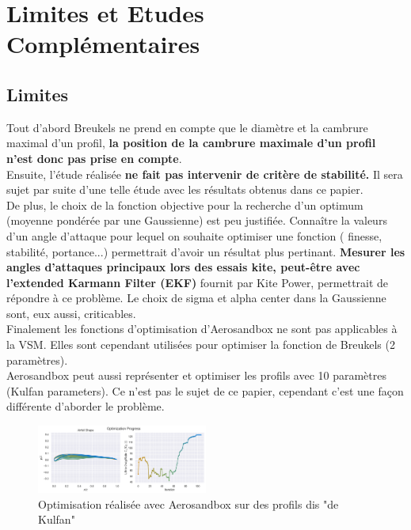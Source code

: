 \IEEEpeerreviewmaketitle
\section{ Limites et Etudes Complémentaires}
\label{sec:Ch4}

\subsection{Limites}
\label{sec:Ch4.1}

Tout d'abord Breukels ne prend en compte que le diamètre et la cambrure maximal d'un profil, \textbf{la position de la cambrure maximale d'un profil n'est donc pas prise en compte}. \\

Ensuite, l'étude réalisée \textbf{ne fait pas intervenir de critère de stabilité.} Il sera sujet par suite d'une telle étude avec les résultats obtenus dans ce papier.\\

De plus, le choix de la fonction objective pour la recherche d'un optimum (moyenne pondérée par une Gaussienne) est peu justifiée. Connaître la valeurs d'un angle d'attaque pour lequel on souhaite optimiser une fonction ( finesse, stabilité, portance...) permettrait d'avoir un résultat plus pertinant. \textbf{Mesurer les angles d'attaques principaux lors des essais kite, peut-être avec l'extended Karmann Filter (EKF)} fournit par Kite Power, permettrait de répondre à ce problème. Le choix de sigma et alpha center dans la Gaussienne sont, eux aussi, criticables.\\

Finalement les fonctions d'optimisation d'Aerosandbox ne sont pas applicables à la VSM. Elles sont cependant utilisées pour optimiser la fonction de Breukels (2 paramètres). \\
Aerosandbox peut aussi représenter et optimiser les profils avec 10 paramètres (Kulfan parameters). Ce n'est pas le sujet de ce papier, cependant c'est une façon différente d'aborder le problème. 

\begin{figure}[H]
    \centering
    \includegraphics[width=0.5\textwidth]{Pics/optim neuralfoil.png}  
    \caption{Optimisation réalisée avec Aerosandbox sur des profils dis "de Kulfan"}
    \label{fig:kulfan}
\end{figure}

